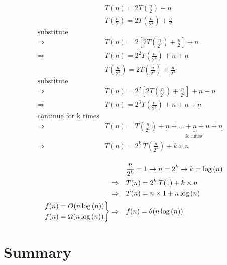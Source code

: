 \documentclass[12pt]{article}
\begin{document}
\begin{align*}
&T(n) = 2 T(\frac{n}{2}) + n \\
&T(\frac{n}{2}) = 2 T(\frac{n}{2^{2}}) + \frac{n}{2} \\
\text{substitute}& \\
\Rightarrow \quad &T(n) =  2 [ 2 T(\frac{n}{2^{2}}) + \frac{n}{2} ] + n \\
\Rightarrow \quad &T(n) = 2^{2} T(\frac{n}{2^{2}}) + n + n \\
&T(\frac{n}{2^{2}}) = 2 T(\frac{n}{2^{3}}) + \frac{n}{2^{3}} \\
\text{substitute} \\
\Rightarrow \quad &T(n) = 2^{2} [ 2 T(\frac{n}{2^{3}}) + \frac{n}{2^{2}} ] + n + n \\
\Rightarrow \quad &T(n) = 2^{3}  T(\frac{n}{2^{3}}) + n + n + n \\
\text{continue for k times}& \\
\Rightarrow \quad &T(n) =  T(\frac{n}{2^{k}}) + \underbrace{n + \dots + n + n + n}_{\text{k times}} \\
\Rightarrow \quad &T(n) = 2^{k} \:  T(\frac{n}{2^{k}}) + k \times n \\
\end{align*}






\begin{align*}
&\frac{n}{2^{k}} = 1 \to n = 2^{k} \to k = \log{(n)}  \\
\Rightarrow \quad &T(n) = 2^{k} \: T(1) + k \times n \\
\Rightarrow \quad &T(n) = n \times 1 + n\log{(n)} \\
\begin{rcases}
&f(n) = O(n\log{(n)}) \\
&f(n) = \Omega(n\log{(n)}) 
\end{rcases}
\Rightarrow \quad &f(n) = \theta(n\log{(n)}) 
\end{align*}









\section{Summary}
\end{document}
